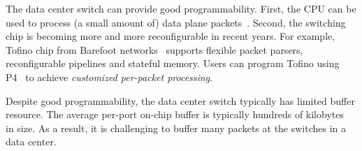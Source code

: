 The data center switch can provide good programmability. First, the CPU can be used to process (a small amount of) data plane packets~\cite{lu2011serverswitch}.
Second, the switching chip is becoming more and more reconfigurable in recent years. For example, Tofino chip from Barefoot networks~\cite{tofino} 
supports flexible packet parsers, reconfigurable pipelines and stateful memory. Users can program Tofino using P4~\cite{bosshart2014p4} to achieve \textit{customized per-packet processing}.

Despite good programmability, the data center switch typically has limited buffer resource.
The average per-port on-chip buffer is typically hundreds of kilobytes~\cite{bai2017congestion} in size.
As a result, it is challenging to buffer many packets at the switches in a data center.







